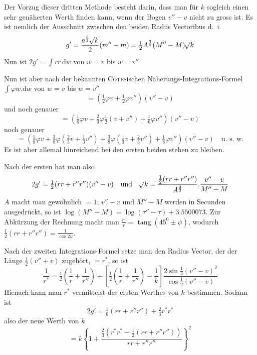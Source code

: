 Der Vorzug dieser dritten Methode besteht darin, dass man für $k$ sogleich einen sehr genäherten Werth finden kann, wenn der Bogen $v''-v$ nicht zu gross ist. Es ist nemlich der Ausschnitt zwischen den beiden Radiis Vectoribus d.\ i.
\[
g'=\frac{a^{\frac32}\mathord{{}^{}\!\surd}k}2(m''-m)=\tfrac12A^{\frac32}(M''-M)\mathord{{}^{}\!\surd}k
\]
Nun ist $2g'=\int rr\,\mathrm{d}w$ von $w=v$ bis $w=v''$.

Nun ist aber nach der bekannten \textsc{Cotes}ischen Näherungs-Integrations-Formel $\int\varphi w.\mathrm{d}w$ von $w=v$ bis $w=v''$
\[
=(\tfrac12\varphi v+\tfrac12\varphi v'')(v''-v)
\]
%
und noch genauer
\[
=(\tfrac16\varphi v+\tfrac23\varphi\tfrac12(v+v'')+\tfrac16\varphi v'')(v''-v)
\]
noch genauer
\[
=(\tfrac18\varphi v+\tfrac38\varphi(\tfrac23v+\tfrac13v'')+\tfrac38\varphi(\tfrac13v+\tfrac23v'')+\tfrac18\varphi v'')(v''-v)\quad\text{u.\ s.\ w.}
\]
Es ist aber allemal hinreichend bei den ersten beiden stehen zu bleiben.

Nach der ersten hat man also
\[
2g'=\tfrac12(rr+r''r'')(v''-v)\quad\text{und}\quad\mathord{{}^{}\!\surd}k=\frac{\tfrac12(rr+r''r'')}{A^{\frac32}}.\frac{v''-v}{M''-M}
\]
$A$ macht man gewöhnlich $=1$; $v''-v$ und $M''-M$ werden in Secunden ausgedrückt, so ist $\log(M''-M)=\log(\tau''-\tau)+3.5500073$. Zur Abkürzung der Rechnung macht man $\frac{r'}r=\operatorname{tang}(45^0\pm\psi)$, wodurch $\tfrac12(rr+r''r'')=\frac1{\cos2\psi}$.

Nach der zweiten Integrations-Formel setze man den Radius Vector, der der Länge $\tfrac12(v''+v)$ zugehört, $=r^*$, so ist
\[
\frac1{r^*}=\tfrac12\left(\frac1r+\frac1{r''}\right)+\left[\tfrac12\left(\frac1r+\frac1{r''}\right)-\frac1k\right]\frac{2\sin\tfrac14(v''-v)^2}{\cos\tfrac12(v''-v)}
\]
Hienach kann man $r^*$ vermittelst des ersten Werthes von $k$ bestimmen. Sodann ist
\[
2g'=\tfrac16(rr+r''r'')+\tfrac23r^*r^*
\]
also der neue Werth von $k$
\[
=k\left\{1+\frac{\tfrac23(r^*r^*-\tfrac12(rr+r''r''))}{rr+r''r''}\right\}^2
\]

